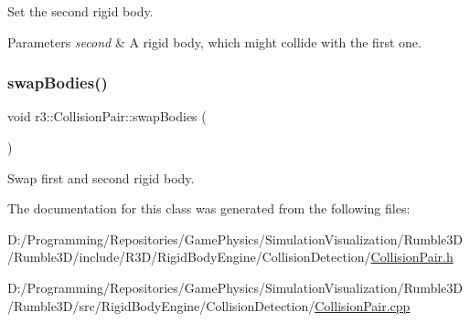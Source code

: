Set the second rigid body. 


\begin{DoxyParams}{Parameters}
{\em second} & A rigid body, which might collide with the first one. \\
\hline
\end{DoxyParams}
\mbox{\label{classr3_1_1_collision_pair_a8ef5b5bae7be7db3ed2574ecd9e5bf9a}} 
\subsubsection{\texorpdfstring{swap\+Bodies()}{swapBodies()}}
{\footnotesize\ttfamily void r3\+::\+Collision\+Pair\+::swap\+Bodies (\begin{DoxyParamCaption}{ }\end{DoxyParamCaption})}



Swap first and second rigid body. 



The documentation for this class was generated from the following files\+:\begin{DoxyCompactItemize}
\item 
D\+:/\+Programming/\+Repositories/\+Game\+Physics/\+Simulation\+Visualization/\+Rumble3\+D/\+Rumble3\+D/include/\+R3\+D/\+Rigid\+Body\+Engine/\+Collision\+Detection/\mbox{\hyperlink{_collision_pair_8h}{Collision\+Pair.\+h}}\item 
D\+:/\+Programming/\+Repositories/\+Game\+Physics/\+Simulation\+Visualization/\+Rumble3\+D/\+Rumble3\+D/src/\+Rigid\+Body\+Engine/\+Collision\+Detection/\mbox{\hyperlink{_collision_pair_8cpp}{Collision\+Pair.\+cpp}}\end{DoxyCompactItemize}

